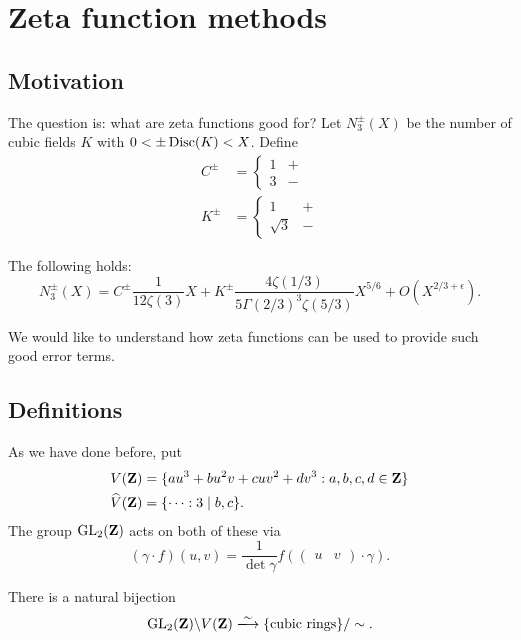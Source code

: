 
\section{Zeta function methods}\label{sec:thorne}





\subsection{Motivation}

The question is: what are zeta functions good for? Let $N_3^\pm(X)$ be the 
number of cubic fields $K$ with $0<\pm\operatorname{Disc}(K)<X$. Define 
\begin{align*}
  C^\pm &= \begin{cases} 1 & + \\ 3 & - \end{cases} \\
  K^\pm &= \begin{cases} 1 & + \\ \sqrt 3 & -\end{cases}
\end{align*}

\begin{theo}
The following holds: 
\[
  N_3^\pm(X)=C^\pm \frac{1}{12\zeta(3)}X + K^\pm \frac{4\zeta(1/3)}{5\Gamma(2/3)^3\zeta(5/3)} X^{5/6} + O(X^{2/3+\epsilon}) .
\]
\end{theo}

We would like to understand how zeta functions can be used to provide such 
good error terms. 





\subsection{Definitions}

As we have done before, put 
\begin{align*}
  V(\mathbf{Z}) &= \{a u^3 + b u^2 v + c u v^2 + d v^3:a,b,c,d\in \mathbf{Z}\} \\
  \widehat V(\mathbf{Z}) &= \{\cdots : 3\mid b,c\} .
\end{align*}
The group $\operatorname{GL}_2(\mathbf{Z})$ acts on both of these via 
\[
  (\gamma\cdot f)(u,v) = \frac{1}{\det\gamma}f\left(\begin{pmatrix} u & v\end{pmatrix}\cdot \gamma\right) .
\]
\begin{theo}
There is a natural bijection 
\[
  \generallinear_2(\dZ)\backslash V(\dZ) \iso \{\text{cubic rings}\}/\sim .
\]
\end{theo}

